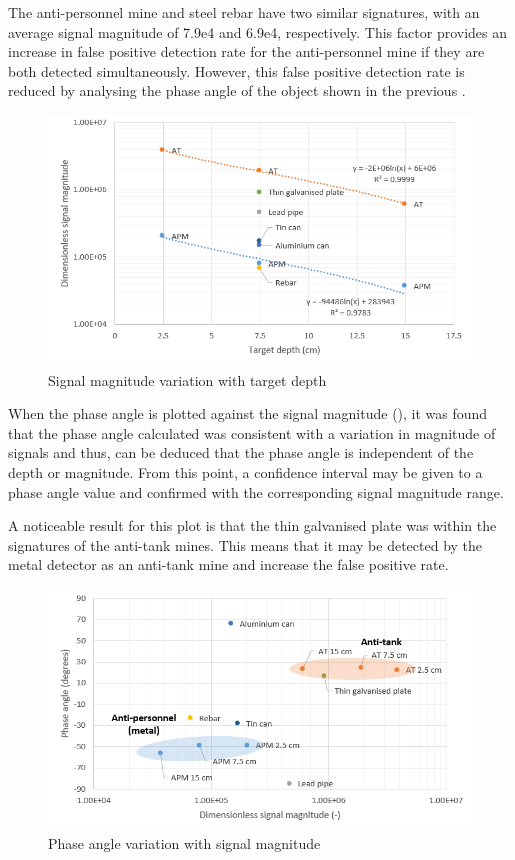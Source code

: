 \documentclass[main.tex]{subfiles}
\begin{document}
The anti-personnel mine and steel rebar have two similar signatures, with an average signal magnitude of 7.9e4 and 6.9e4, respectively. This factor provides an increase in false positive detection rate for the anti-personnel mine if they are both detected simultaneously. However, this false positive detection rate is reduced by analysing the phase angle of the object shown in the previous .

\begin{figure}[!ht]
\includegraphics[width=\textwidth]{5-Testing/magDepth.PNG}
\centering
\caption{Signal magnitude variation with target depth }
\end{figure}

When the phase angle is plotted against the signal magnitude (), it was found that the phase angle calculated was consistent with a variation in magnitude of signals and thus, can be deduced that the phase angle is independent of the depth or magnitude. From this point, a confidence interval may be given to a phase angle value and confirmed with the corresponding signal magnitude range. 

A noticeable result for this plot is that the thin galvanised plate was within the signatures of the anti-tank mines. This means that it may be detected by the metal detector as an anti-tank mine and increase the false positive rate. 

\begin{figure}[ht]
\includegraphics[width=\textwidth]{5-Testing/phaseMag.PNG}
\centering
\caption{Phase angle variation with signal magnitude}
\end{figure}
\end{document}
